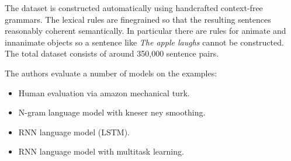 The dataset is constructed automatically using handcrafted context-free grammars. The lexical rules are finegrained so that the resulting sentences reasonably coherent semantically. In particular there are rules for animate and innanimate objects so a sentence like \textit{The apple laughs} cannot be constructed. The total dataset consists of around 350,000 sentence pairs.

The authors evaluate a number of models on the examples:
\begin{itemize}
  \item Human evaluation via amazon mechanical turk.
  \item N-gram language model with kneser ney smoothing.
  \item RNN language model (LSTM).
  \item RNN language model with multitask learning.
\end{itemize}

